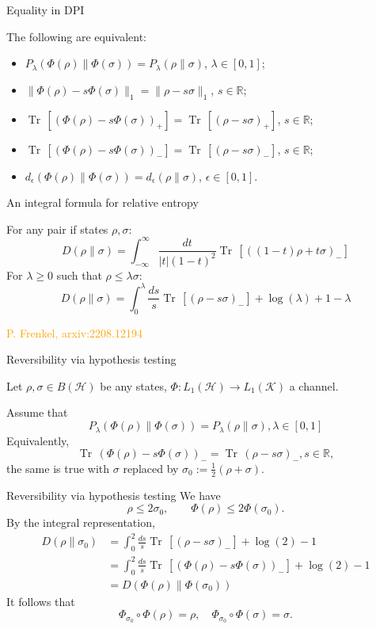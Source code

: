\documentclass[mathserif]{beamer}
\newcommand{\<}{\langle}
\renewcommand{\>}{\rangle}
\newcommand{\Tr}{\operatorname{Tr}\,}
\newcommand{\Ha}{\mathcal H}
\newcommand{\Ka}{\mathcal K}
\begin{document}
\begin{frame}{Equality in DPI}

The following are equivalent:

\bigskip

\begin{itemize}
\item $P_\lambda(\Phi(\rho)\|\Phi(\sigma))= P_\lambda(\rho\|\sigma)$, $\lambda\in [0,1]$;
\item $\|\Phi(\rho)-s\Phi(\sigma)\|_1=\|\rho-s\sigma\|_1$, $s\in \mathbb R$;
\item $\Tr[(\Phi(\rho)-s\Phi(\sigma))_+]= \Tr[(\rho-s\sigma)_+]$, $s\in \mathbb R$;
\item $\Tr[(\Phi(\rho)-s\Phi(\sigma))_-]= \Tr[(\rho-s\sigma)_-]$, $s\in \mathbb R$;
\item $d_\epsilon(\Phi(\rho)\|\Phi(\sigma))=d_\epsilon(\rho\|\sigma)$, $\epsilon\in
[0,1]$.
\end{itemize}
\bigskip
{}

\end{frame}


\begin{frame}{An integral formula for relative entropy}


For any pair if states $\rho,\sigma$:
\medskip
\[
D(\rho\|\sigma)=\int_{-\infty}^\infty \frac{dt}{|t|(1-t)^2}\Tr[((1-t)\rho+t\sigma)_-]
\]
For $\lambda\ge 0$ such that  $\rho\le \lambda\sigma$:
\medskip
\[
D(\rho\|\sigma)=\int_0^\lambda \frac{ds}{s}\Tr[(\rho-s\sigma)_-]+ \log(\lambda)+1-\lambda
\]


\vfill
{\footnotesize 
 \textcolor{orange}{P.  Frenkel, arxiv:2208.12194}
}
\end{frame}

\begin{frame}{Reversibility via hypothesis testing}

Let $\rho, \sigma\in B(\Ha)$ be any states, $\Phi: L_1(\Ha)\to L_1(\Ka)$ a channel.
\bigskip

Assume that
\[
P_\lambda(\Phi(\rho)\|\Phi(\sigma))= P_\lambda(\rho\|\sigma), \lambda\in [0,1]
\]
Equivalently,
\[
\Tr(\Phi(\rho)-s\Phi(\sigma))_-=\Tr(\rho-s\sigma)_-, s\in \mathbb R,
\]
the same is true with $\sigma$ replaced by $\sigma_0:=\frac12(\rho+\sigma)$.
\end{frame}


\begin{frame}{Reversibility via hypothesis testing}
We have  
\[
\rho\le 2\sigma_0,\qquad \Phi(\rho)\le 2\Phi(\sigma_0).
\]
By the
integral representation,
\begin{align*}
D(\rho\|\sigma_0)&=\int_0^2 \frac{ds}{s}\Tr[(\rho-s\sigma)_-]+
\log(2)-1\\
&=
\int_0^2 \frac{ds}{s}\Tr[(\Phi(\rho)-s\Phi(\sigma))_-]+
\log(2)-1\\
&=D(\Phi(\rho)\|\Phi(\sigma_0))
\end{align*}
It follows that
\[
\Phi_{\sigma_0}\circ\Phi(\rho)=\rho,\quad \Phi_{\sigma_0}\circ\Phi(\sigma)=\sigma.
\]



\end{frame}
\end{document}
